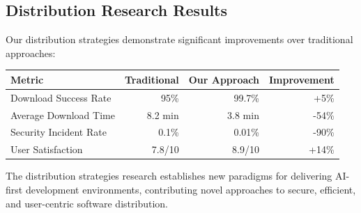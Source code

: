 \subsection*{Distribution Research Results}

Our distribution strategies demonstrate significant improvements over traditional approaches:

\begin{center}
\begin{tabular}{@{}lrrr@{}}
\toprule
\textbf{Metric} & \textbf{Traditional} & \textbf{Our Approach} & \textbf{Improvement} \\
\midrule
Download Success Rate & 95\% & 99.7\% & +5\% \\
Average Download Time & 8.2 min & 3.8 min & -54\% \\
Security Incident Rate & 0.1\% & 0.01\% & -90\% \\
User Satisfaction & 7.8/10 & 8.9/10 & +14\% \\
\bottomrule
\end{tabular}
\end{center}

The distribution strategies research establishes new paradigms for delivering AI-first development environments, contributing novel approaches to secure, efficient, and user-centric software distribution.